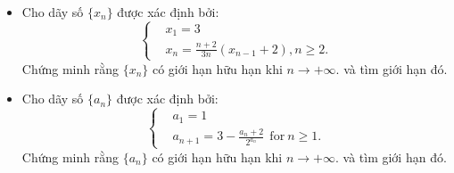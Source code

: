 \documentclass[11pt]{scrartcl}
\begin{document}
\begin{itemize}[label=, leftmargin=0em, itemsep=-0em]

    \item \begin{btvn}
        Cho dãy số $\{x_n\}$ được xác định bởi: $$\left\{\begin{aligned}& x_1=3 \\ & x_n=\frac{n+2}{3n}(x_{n-1}+2), n\geq 2.\end{aligned}\right.$$
        Chứng minh rằng $\{x_n\}$ có giới hạn hữu hạn khi $n\to+\infty.$ và tìm giới hạn đó.
    \end{btvn}

    \vspace{1em}
    \item \begin{btvn}
        Cho dãy số $\{a_n\}$ được xác định bởi: $$\left\{\begin{aligned}& a_1=1 \\ & a_{n+1}=3-\frac{a_{n}+2}{2^{a_{n}}}\ \ \text{for} \ n\geq 1.\end{aligned}\right.$$
        Chứng minh rằng $\{a_n\}$ có giới hạn hữu hạn khi $n\to+\infty.$ và tìm giới hạn đó.
    \end{btvn}


\end{itemize}
\end{document}
